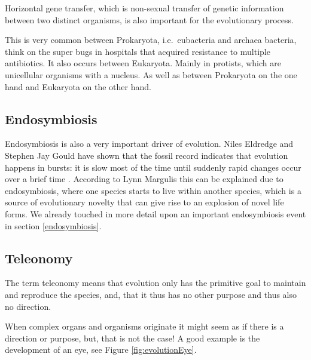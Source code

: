 \documentclass[
  11pt,
]{book}
\begin{document}
Horizontal gene transfer, which is non-sexual transfer of genetic information between two distinct organisms, is also important for the evolutionary process.

This is very common between Prokaryota, i.e.~eubacteria and archaea bacteria, think on the super bugs in hospitals that acquired resistance to multiple antibiotics. It also occurs between Eukaryota. Mainly in protists, which are unicellular organisms with a nucleus. As well as between Prokaryota on the one hand and Eukaryota on the other hand.

\hypertarget{endosymbiosis-1}{%
\subsection{Endosymbiosis}\label{endosymbiosis-1}}

Endosymbiosis is also a very important driver of evolution. Niles Eldredge and Stephen Jay Gould have shown that the fossil record indicates that evolution happens in bursts: it is slow most of the time until suddenly rapid changes occur over a brief time \citep{margulis1999}. According to Lynn Margulis this can be explained due to endosymbiosis, where one species starts to live within another species, which is a source of evolutionary novelty that can give rise to an explosion of novel life forms. We already touched in more detail upon an important endosymbiosis event in section \ref{endosymbiosis}.

\hypertarget{teleonomy}{%
\subsection{Teleonomy}\label{teleonomy}}

The term teleonomy means that evolution only has the primitive goal to maintain and reproduce the species, and, that it thus has no other purpose and thus also no direction.

When complex organs and organisms originate it might seem as if there is a direction or purpose, but, that is not the case! A good example is the development of an eye, see Figure \ref{fig:evolutionEye}.
\end{document}
